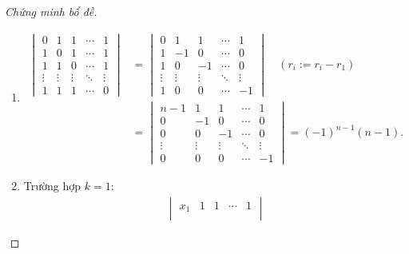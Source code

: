 \documentclass[class=nhvh-linear-algebra,crop=false]{standalone}
\begin{document}
\begin{proof}[Chứng minh bổ đề]
	\begin{enumerate}[label = (\roman*)]
		\item
		      \begingroup{}
		      \allowdisplaybreaks{}
		      \begin{align*}
			      \begin{vmatrix}
				      0      & 1      & 1      & \cdots & 1      \\
				      1      & 0      & 1      & \cdots & 1      \\
				      1      & 1      & 0      & \cdots & 1      \\
				      \vdots & \vdots & \vdots & \ddots & \vdots \\
				      1      & 1      & 1      & \cdots & 0
			      \end{vmatrix}
			       & =
			      \begin{vmatrix}
				      0      & 1      & 1      & \cdots & 1      \\
				      1      & -1     & 0      & \cdots & 0      \\
				      1      & 0      & -1     & \cdots & 0      \\
				      \vdots & \vdots & \vdots & \ddots & \vdots \\
				      1      & 0      & 0      & \cdots & -1
			      \end{vmatrix}\quad(r_{i}:= r_{i} - r_{1}) \\
			       & =
			      \begin{vmatrix}
				      n-1    & 1      & 1      & \cdots & 1      \\
				      0      & -1     & 0      & \cdots & 0      \\
				      0      & 0      & -1     & \cdots & 0      \\
				      \vdots & \vdots & \vdots & \ddots & \vdots \\
				      0      & 0      & 0      & \cdots & -1
			      \end{vmatrix}
			      = {(-1)}^{n-1}(n-1).
		      \end{align*}
		      \endgroup{}
		\item
		      \par Trường hợp $k = 1$:
		      \begingroup{}
		      \allowdisplaybreaks{}
		      \begin{align*}
			      \begin{vmatrix}
				      x_{1}  & 1      & 1      & \cdots & 1      \\

\end{vmatrix}
\end{align*}
\end{enumerate}
\end{proof}
\end{document}
